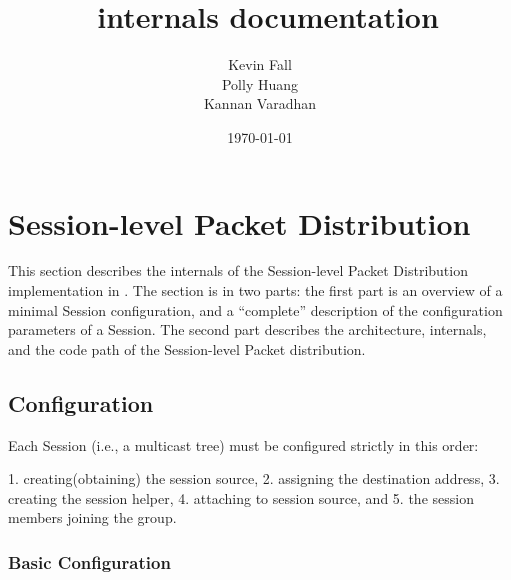 \documentclass{article}
\begin{document}
\title{\nsTcl\ internals documentation}
\author{%
  Kevin Fall \\
  Polly Huang \\
  Kannan Varadhan }
\date{\today}


\section{Session-level Packet Distribution}
\label{sec:session}

This section describes the internals of the Session-level Packet Distribution
implementation in \ns.
The section is in two parts:
the first part is an overview of 
a minimal Session configuration,
and a ``complete'' description of the configuration parameters 
of a Session.
The second part describes the architecture, internals, and the code path
of the Session-level Packet distribution.

\subsection{Configuration}
\label{sec:session-config}

Each Session (i.e., a multicast tree) must be configured strictly in
this order:
 
1. creating(obtaining) the session source,
2. assigning the destination address,
3. creating the session helper, 
4. attaching to session source, and
5. the session members joining the group.


\subsubsection{Basic Configuration}
\label{sec:basic-config}
\end{document}
